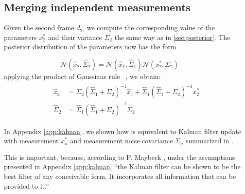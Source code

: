 \subsection{Merging independent measurements} 
\label{sec:combining}

Given the second frame $d_2$, we compute the corresponding value of the parameters $x_2^*$ and their variance $\Sigma_2$ the same way as in \ref{sec:posterior}. The posterior distribution of the parameters now has the form 
 
\begin{equation}
\mathcal{N}(\hat{x}_2, \hat{\Sigma}_2) = \mathcal{N}(\hat{x}_1, \hat{\Sigma}_1) \mathcal{N}(x_2^*, \Sigma_2) \quad\quad
\end{equation}
applying the product of Gaussians rule ~\cite{petersen2008matrix}, we obtain:
\begin{align}
\begin{split}
\hat{x}_2 &= \Sigma_2 (\hat{\Sigma}_1 + \Sigma_2)^{-1} \hat{x}_1 + 
\hat{\Sigma}_1 (\hat{\Sigma}_1 + \Sigma_2)^{-1} x_2^*
\\
\hat{\Sigma}_2 &= \hat{\Sigma}_1 (\hat{\Sigma}_1 + \Sigma_2)^{-1} \Sigma_2
\label{eq:combining}
\end{split}
\end{align}

In Appendix \ref{app:kalman}, we shown how  is equivalent to Kalman filter update with measurement $x_n^*$ and measurement noise covariance $\Sigma_n$ summarized in .

This is important, because, according to P. Maybeck \cite{maybeck1979stochastic}, under the assumptions presented in Appendix \ref{app:kalman} ``the Kalman filter can be shown to be the best filter of any conceivable form. It incorporates all information that can be provided to it.''

